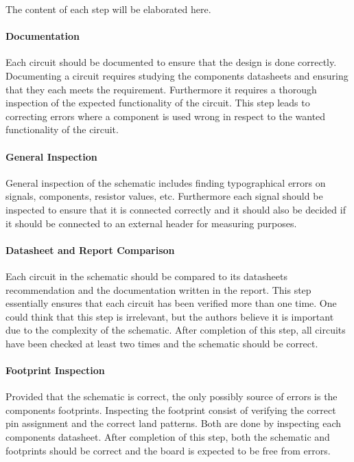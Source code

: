 The content of each step will be elaborated here. 

\paragraph{Documentation}
Each circuit should be documented to ensure that the design is done correctly.
Documenting a circuit requires studying the components datasheets and ensuring that they each meets the requirement.
Furthermore it requires a thorough inspection of the expected functionality of the circuit.
This step leads to correcting errors where a component is used wrong in respect to the wanted functionality of the circuit.

\paragraph{General Inspection}
General inspection of the schematic includes finding typographical errors on signals, components, resistor values, etc.
Furthermore each signal should be inspected to ensure that it is connected correctly and it should also be decided if it should be connected to an external header for measuring purposes.

\paragraph{Datasheet and Report Comparison}
Each circuit in the schematic should be compared to its datasheets recommendation and the documentation written in the report. 
This step essentially ensures that each circuit has been verified more than one time. 
One could think that this step is irrelevant, but the authors believe it is important due to the complexity of the schematic.
After completion of this step, all circuits have been checked at least two times and the schematic should be correct. 

\paragraph{Footprint Inspection}
Provided that the schematic is correct, the only possibly source of errors is the components footprints. 
Inspecting the footprint consist of verifying the correct pin assignment and the correct land patterns.
Both are done by inspecting each components datasheet. 
After completion of this step, both the schematic and footprints should be correct and the board is expected to be free from errors.

